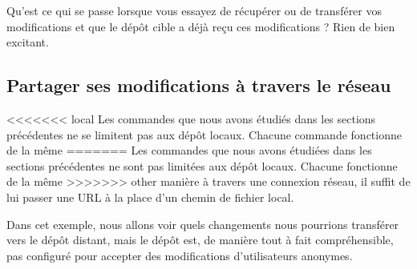 Qu'est ce qui se passe lorsque vous essayez de récupérer ou de transférer
vos modifications et que le dépôt cible a déjà reçu ces modifications ? 
Rien de bien excitant.

\subsection{Partager ses modifications à travers le réseau}

<<<<<<< local
Les commandes que nous avons étudiés dans les sections précédentes
ne se limitent pas aux dépôt locaux. Chacune commande fonctionne de la même
=======
Les commandes que nous avons étudiées dans les sections précédentes
ne sont pas limitées aux dépôt locaux. Chacune fonctionne de la même
>>>>>>> other
manière à travers une connexion réseau, il suffit de lui passer une 
URL à la place d'un chemin de fichier local.

Dans cet exemple, nous allons voir quels changements nous pourrions
transférer vers le dépôt distant, mais le dépôt est, de manière tout
à fait compréhensible, pas configuré pour accepter des modifications
d'utilisateurs anonymes.

